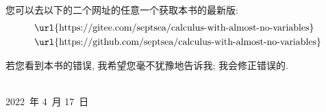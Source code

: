 您可以去以下的二个网址的任意一个获取本书的最新版:
\begin{align*}
     & \text{\url{https://gitee.com/septsea/calculus-with-almost-no-variables}}  \\
     & \text{\url{https://github.com/septsea/calculus-with-almost-no-variables}}
\end{align*}

若您看到本书的错误, 我希望您毫不犹豫地告诉我;
我会修正错误的.

\begin{flushright}
    \theauthor\\
    2022~年 4~月 17~日
\end{flushright}
